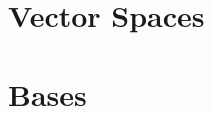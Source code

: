 \documentclass[british,11pt,a4paper]{report}
\begin{document}
\maketitle
\tableofcontents

\chapter{Vector Spaces}

\chapter{Bases}

\end{document}
